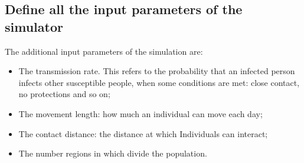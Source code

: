 \documentclass[twocolumn,letterpaper]{report}
\begin{document}
{			\subsection{Define all the input parameters of the simulator}
					The additional input parameters of the simulation are:
					\begin{itemize}
						\item The transmission rate. This refers to the probability that an infected person infects other susceptible people, when some conditions are met: close contact, no protections and so on;
						\item The movement length: how much an individual can move each day;
						\item The contact distance: the distance at which Individuals can interact;
						\item The number regions in which divide the population.
					\end{itemize}
					
}
\end{document}
